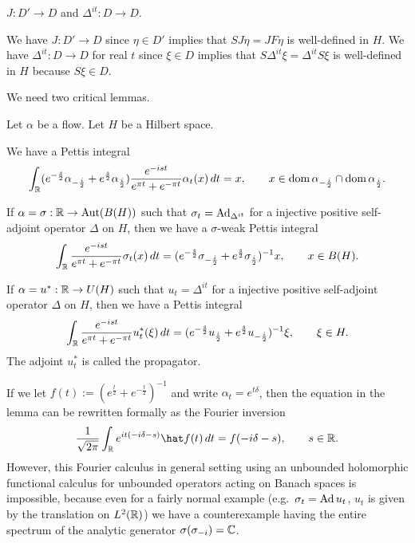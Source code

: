 \documentclass{../../small}
\begin{document}
\begin{lem*}
$J:D'\to D$ and $\Delta^{it}:D\to D$.
\end{lem*}
\begin{pf}
We have $J:D'\to D$ since $\eta\in D'$ implies that $SJ\eta=JF\eta$ is well-defined in $H$.
We have $\Delta^{it}:D\to D$ for real $t$ since $\xi\in D$ implies that $S\Delta^{it}\xi=\Delta^{it}S\xi$ is well-defined in $H$ because $S\xi\in D$.
\end{pf}



We need two critical lemmas.

\begin{lem}
Let $\alpha$ be a flow.
Let $H$ be a Hilbert space.
\begin{parts}
\item We have a Pettis integral
\[\int_{\mathbb{R}}(e^{-\frac s2}\alpha_{-\frac i2}+e^{\frac s2}\alpha_{\frac i2})\frac{e^{-ist}}{e^{\pi t}+e^{-\pi t}}\alpha_t(x)\,dt
=x,\qquad x\in\operatorname{dom}\alpha_{-\frac i2}\cap\operatorname{dom}\alpha_{\frac i2}.\]
\item If $\alpha=\sigma:\mathbb{R}\to\operatorname{Aut}(B(H))$ such that $\sigma_t=\operatorname{Ad}_{\Delta^{it}}$ for a injective positive self-adjoint operator $\Delta$ on $H$, then we have a $\sigma$-weak Pettis integral
\[\int_{\mathbb{R}}\frac{e^{-ist}}{e^{\pi t}+e^{-\pi t}}\sigma_t(x)\,dt
=(e^{-\frac s2}\sigma_{-\frac i2}+e^{\frac s2}\sigma_{\frac i2})^{-1}x,\qquad x\in B(H).\]
\item If $\alpha=u^*:\mathbb{R}\to U(H)$ such that $u_t=\Delta^{it}$ for a injective positive self-adjoint operator $\Delta$ on $H$, then we have a Pettis integral
\[\int_{\mathbb{R}}\frac{e^{-ist}}{e^{\pi t}+e^{-\pi t}}u_t^*(\xi)\,dt
=(e^{-\frac s2}u_{\frac i2}+e^{\frac s2}u_{-\frac i2})^{-1}\xi,\qquad \xi\in H.\]
The adjoint $u_t^*$ is called the propagator.
\end{parts}
\end{lem}
\begin{rmk*}
If we let $f(t):=(e^{\frac t2}+e^{-\frac t2})^{-1}$ and write $\alpha_t=e^{t\delta}$, then the equation in the lemma can be rewritten formally as the Fourier inversion
\[\frac1{\sqrt{2\pi}}\int_\R e^{it(-i\delta-s)}\hat f(t)\,dt=f(-i\delta-s),\qquad s\in\R.\]
However, this Fourier calculus in general setting using an unbounded holomorphic functional calculus for unbounded operators acting on Banach spaces is impossible, because even for a fairly normal example (e.g.~$\sigma_t=\operatorname{Ad} u_t$, $u_t$ is given by the translation on $L^2(\mathbb{R})$) we have a counterexample having the entire spectrum of the analytic generator $\sigma(\sigma_{-i})=\mathbb{C}$.
\end{rmk*}
\end{document}
